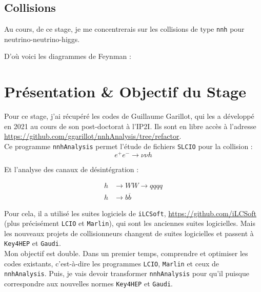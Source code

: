 \documentclass[10pt,a4paper]{report}
\newcommand{\cad}{c'est-à-dire\xspace}
\newcommand{\SLCIO}{\texttt{SLCIO}\xspace}
\newcommand{\iLCSoft}{\texttt{iLCSoft}\xspace}
\newcommand{\LCIO}{\texttt{LCIO}\xspace}
\newcommand{\Marlin}{\texttt{Marlin}\xspace}
\newcommand{\Gaudi}{\texttt{Gaudi}\xspace}
\newcommand{\nnhAnalysis}{\texttt{nnhAnalysis}\xspace}
\newcommand{\bbar}{\overline{b}}
\begin{document}
\subsection{Collisions}

Au cours, de ce stage, je me concentrerais sur les collisions de type \texttt{nnh} pour neutrino-neutrino-higgs.

D'où voici les diagrammes de Feynman :

\begin{figure}
	\centering
	\begin{tikzpicture}
	
	\end{tikzpicture}
	\label{feynmann}
\end{figure}

\section{Présentation \& Objectif du Stage}

Pour ce stage, j'ai récupéré les codes de Guillaume Garillot, qui les a développé en 2021 au cours de son post-doctorat à l'IP2I. 
Ils sont en libre accès à l'adresse \url{https://github.com/ggarillot/nnhAnalysis/tree/refactor}.\\

Ce programme \nnhAnalysis permet l'étude de fichiers \SLCIO pour la collision :
\begin{equation}
	e^{+} e^{-} \longrightarrow \nu \nu h 
\end{equation}

Et l'analyse des canaux de désintégration :

\begin{align}
	h &\longrightarrow WW \longrightarrow qqqq \\
	h &\longrightarrow b \bbar 
\end{align}

Pour cela, il a utilisé les suites logiciels de \iLCSoft, \url{https://github.com/iLCSoft} (plus précisément \LCIO et \Marlin), qui sont les anciennes suites logicielles.
Mais les nouveaux projets de collisionneurs changent de suites logicielles et passent à \texttt{Key4HEP} et \Gaudi.\\

Mon objectif est double. Dans un premier temps, comprendre et optimiser les codes existants, \cad les programmes \LCIO, \Marlin et ceux de \nnhAnalysis. Puis, je vais devoir transformer \nnhAnalysis pour qu'il puisque correspondre aux nouvelles normes \texttt{Key4HEP} et \Gaudi.
\end{document}
